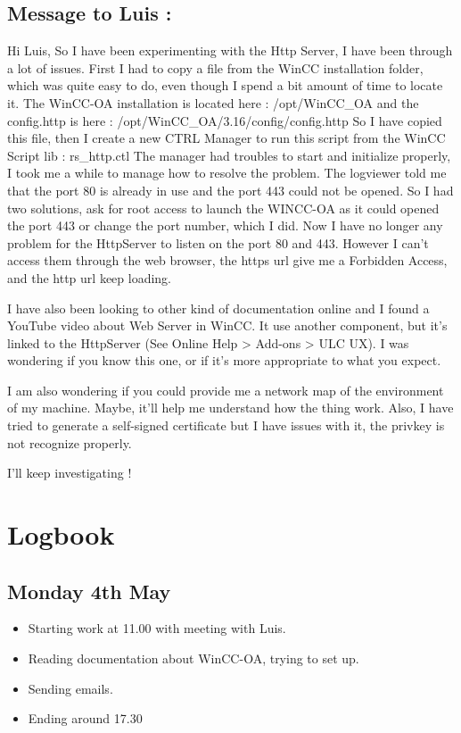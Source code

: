 \documentclass[a4paper, 10pt]{article}
\begin{document}
\subsection*{Message to Luis :}

Hi Luis,
So I have been experimenting with the Http Server, I have been through a lot of issues.
First I had to copy a file from the WinCC installation folder, which was quite easy to do, even though I spend a bit amount of time to locate it.
The WinCC-OA installation is located here : /opt/WinCC\_OA and the config.http is here : /opt/WinCC\_OA/3.16/config/config.http
So I have copied this file, then I create a new CTRL Manager to run this script from the WinCC Script lib : rs\_http.ctl
The manager had troubles to start and initialize properly, I took me a while to manage how to resolve the problem.
The logviewer told me that the port 80 is already in use and the port 443 could not be opened.
So I had two solutions, ask for root access to launch the WINCC-OA as it could opened the port 443 or change the port number, which I did.
Now I have no longer any problem for the HttpServer to listen on the port 80 and 443.
However I can't access them through the web browser, the https url give me a Forbidden Access, and the http url keep loading.

I have also been looking to other kind of documentation online and I found a YouTube video about Web Server in WinCC. 
It use another component, but it's linked to the HttpServer (See Online Help > Add-ons > ULC UX).
I was wondering if you know this one, or if it's more appropriate to what you expect.

I am also wondering if you could provide me a network map of the environment of my machine. Maybe, it'll help me understand how the thing work.
Also, I have tried to generate a self-signed certificate but I have issues with it, the privkey is not recognize properly.

I'll keep investigating !

\newpage

\section{Logbook}
\subsection*{Monday 4th May}
\begin{itemize}
    \item Starting work at 11.00 with meeting with Luis.
    \item Reading documentation about WinCC-OA, trying to set up.
    \item Sending emails.
    \item Ending around 17.30
\end{itemize}
\end{document}
